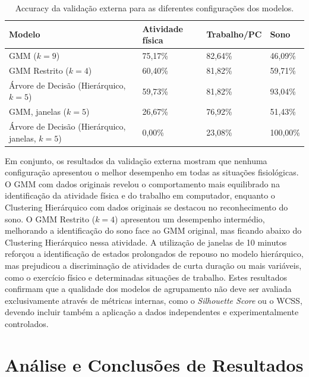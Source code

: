 \begin{table}[H]
\centering
\caption{Accuracy da validação externa para as diferentes configurações dos modelos.}
\label{tab:validacao_externa}
\small
\begin{tabular*}{.95\textwidth}{@{} p{.38\linewidth} p{.17\linewidth} p{.17\linewidth} p{.14\linewidth} @{}}
\toprule
\textbf{\footnotesize Modelo} & \textbf{Atividade física} & \textbf{Trabalho/PC} & \textbf{Sono} \\
\midrule
{\footnotesize GMM ($k=9$)} & 75,17\% & 82,64\% & 46,09\% \\
{\footnotesize GMM Restrito ($k=4$)} & 60,40\% & 81,82\% & 59,71\% \\
{\footnotesize Árvore de Decisão (Hierárquico, $k=5$)} & 59,73\% & 81,82\% & 93,04\% \\
{\footnotesize GMM, janelas ($k=5$)} & 26,67\% & 76,92\% & 51,43\% \\
{\footnotesize Árvore de Decisão (Hierárquico, janelas, $k=5$)} & 0,00\% & 23,08\% & 100,00\% \\
\bottomrule
\end{tabular*}
\end{table}

Em conjunto, os resultados da validação externa mostram que nenhuma configuração apresentou o melhor desempenho em todas as situações fisiológicas. O GMM com dados originais revelou o comportamento mais equilibrado na identificação da atividade física e do trabalho em computador, enquanto o Clustering Hierárquico com dados originais se destacou no reconhecimento do sono. O GMM Restrito ($k=4$) apresentou um desempenho intermédio, melhorando a identificação do sono face ao GMM original, mas ficando abaixo do Clustering Hierárquico nessa atividade. A utilização de janelas de 10 minutos reforçou a identificação de estados prolongados de repouso no modelo hierárquico, mas prejudicou a discriminação de atividades de curta duração ou mais variáveis, como o exercício físico e determinadas situações de trabalho. Estes resultados confirmam que a qualidade dos modelos de agrupamento não deve ser avaliada exclusivamente através de métricas internas, como o \textit{Silhouette Score} ou o WCSS, devendo incluir também a aplicação a dados independentes e experimentalmente controlados.

\clearpage
\section{Análise e Conclusões de Resultados}
\label{sec:analise_conclusoes}

